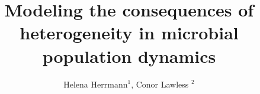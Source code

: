 \documentclass{bioinfo}
\begin{document}

\title[Msc Dissertation]{Modeling the consequences of heterogeneity in microbial population dynamics}
\author[Helena Herrmann]{Helena Herrmann$^{1}$, Conor Lawless $^{2}$}
\address{$^{1}$School of Computing Science, Newcastle University, UK\\ $^{2}$Institute for Cell and Molecular BioSciences, Newcastle University, UK}


\history{ }
\editor{\vspace{-1em}}
\maketitle

\maketitle
\end{document}
